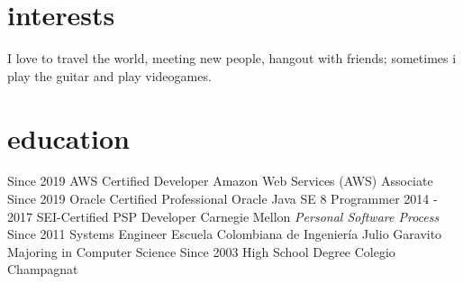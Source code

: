 \documentclass[]{twentysecondcv}
\begin{document}







\makeprofile


\section{interests}
I love to travel the world, meeting new people, hangout with friends; sometimes i play the guitar and play videogames.

\section{education}

\begin{twenty}
  \twentyitem
    {Since 2019}
    {AWS Certified Developer}
    {Amazon Web Services (AWS)}
    {Associate}
  \twentyitem
    {Since 2019}
    {Oracle Certified Professional}
    {Oracle}
    {Java SE 8 Programmer}
  \twentyitem
    {2014 - 2017}
    {SEI-Certified PSP Developer}
    {Carnegie Mellon}
    {\emph{Personal Software Process}}
  \twentyitem
    {Since 2011}
    {Systems Engineer}
    {Escuela Colombiana de Ingenier\'ia  Julio Garavito}
    {Majoring in Computer Science}
  \twentyitem
    {Since 2003}
    {High School Degree}
    {Colegio Champagnat}
    {}
\end{twenty}
\end{document}
